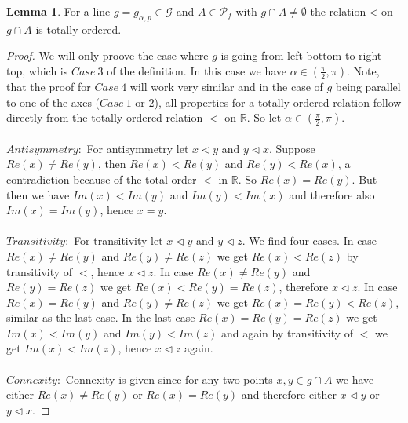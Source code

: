 \documentclass[12pt,a4paper]{scrartcl}
\numberwithin{equation}{subsection}
\newcommand{\1}{\mathbbm{1}}
\newcommand{\G}{\mathcal{G}}
\numberwithin{equation}{section}
\theoremstyle{definition}
\newtheorem{lemma}{Lemma}[subsection]
\begin{document}
\begin{lemma}
For a line $g=g_{\alpha,p}\in\G$ and $A\in \mathcal{P}_f$ with $g\cap A\neq \emptyset$ the relation $\triangleleft$ on $g\cap A$ is totally ordered. 
	\begin{proof}
		We will only proove the case where $g$ is going from left-bottom to right-top, which is $\mathit{Case}\ 3$ of the definition. In this case we have $\alpha\in (\frac{\pi}{2},\pi)$. Note, that the proof for $\mathit{Case\ }4$ will work very similar and in the case of $g$ being parallel to one of the axes ($\mathit{Case\ }1$ or $2$), all properties for a totally ordered relation follow directly from the totally ordered relation $<$ on $\mathbb{R}$. So let $\alpha\in (\frac{\pi}{2},\pi)$. \\
		\\
		$\mathit{Antisymmetry:}$ For antisymmetry let $x \triangleleft y$ and $y \triangleleft x$. Suppose $Re(x)\neq Re(y)$, then $Re(x) < Re(y)$ and $Re(y) < Re(x)$, a contradiction because of the total order $<$ in $\mathbb{R}$. So $Re(x) = Re(y)$. But then we have $Im(x) < Im(y)$ and $Im(y) < Im(x)$ and therefore also $Im(x) = Im(y)$, hence $x=y$. \\
		\\
		$\mathit{Transitivity:}$ For transitivity let $x \triangleleft y$ and $y \triangleleft z$. We find four cases. In case $Re(x) \neq Re(y)$ and $Re(y) \neq Re(z)$ we get $Re(x) < Re(z)$ by transitivity of $<$, hence $x \triangleleft z$. In case $Re(x)\neq Re(y)$ and $Re(y) = Re(z)$ we get $Re(x) < Re(y) = Re(z)$, therefore $x \triangleleft z$. In case $Re(x) = Re(y)$ and $Re(y) \neq Re(z)$ we get $Re(x) = Re(y) < Re(z)$, similar as the last case. In the last case $Re(x) = Re(y) = Re(z)$ we get $Im(x) < Im(y)$ and $Im(y) < Im(z)$ and again by transitivity of $<$ we get $Im(x) < Im(z)$, hence $x \triangleleft z$ again. \\
		\\
		$\mathit{Connexity:}$ Connexity is given since for any two points $x,y\in g\cap A$ we have either $Re(x) \neq Re(y)$ or $Re(x) = Re(y)$ and therefore either $x\triangleleft y$ or $y\triangleleft x$.
	 
	\end{proof}
\end{lemma}
\end{document}
